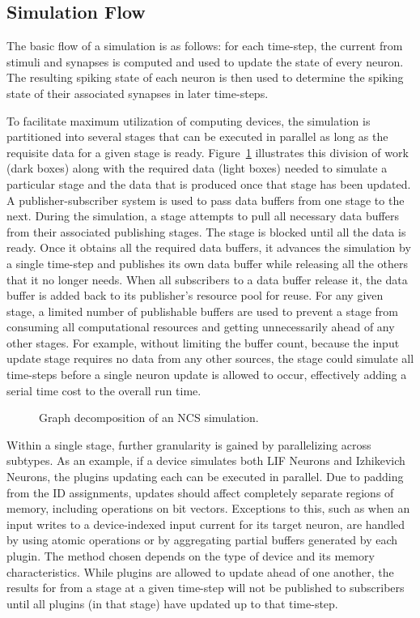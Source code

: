 \subsection{Simulation Flow}

The basic flow of a simulation is as follows: for each time-step, the
current from stimuli and synapses is computed and used to update the
state of every neuron. The resulting spiking state of each neuron is
then used to determine the spiking state of their associated synapses
in later time-steps.

To facilitate maximum utilization of computing devices, the simulation
is partitioned into several stages that can be executed in parallel as
long as the requisite data for a given stage is ready. Figure~\ref{fig:ncs_flow} 
illustrates this division of work (dark boxes) along with the required
data (light boxes) needed to simulate a particular stage and the data
that is produced once that stage has been updated. A publisher-subscriber
system is used to pass data buffers from one stage to the next. During
the simulation, a stage attempts to pull all necessary data buffers
from their associated publishing stages. The stage is blocked until
all the data is ready. Once it obtains all the required data buffers,
it advances the simulation by a single time-step and publishes its own
data buffer while releasing all the others that it no longer needs. When
all subscribers to a data buffer release it, the data buffer is added
back to its publisher's resource pool for reuse. For any given stage,
a limited number of publishable buffers are used to prevent a stage from
consuming all computational resources and getting unnecessarily ahead of
any other stages. For example, without limiting the buffer count, because
the input update stage requires no data from any other sources, the stage
could simulate all time-steps before a single neuron update is allowed
to occur, effectively adding a serial time cost to the overall run time.

\begin{figure}
\begin{center}
\end{center}
\caption{Graph decomposition of an NCS simulation.}
\label{fig:ncs_flow}
\end{figure}

Within a single stage, further granularity is gained by parallelizing
across subtypes. As an example, if a device simulates both LIF Neurons
and Izhikevich Neurons, the plugins updating each can be executed
in parallel. Due to padding from the ID assignments, updates should
affect completely separate regions of memory, including operations
on bit vectors. Exceptions to this, such as when an input writes to
a device-indexed input current for its target neuron, are handled by
using atomic operations or by aggregating partial buffers generated by
each plugin. The method chosen depends on the type of device and its
memory characteristics. While plugins are allowed to update ahead of one
another, the results for from a stage at a given time-step will not be
published to subscribers until all plugins (in that stage) have updated
up to that time-step.

